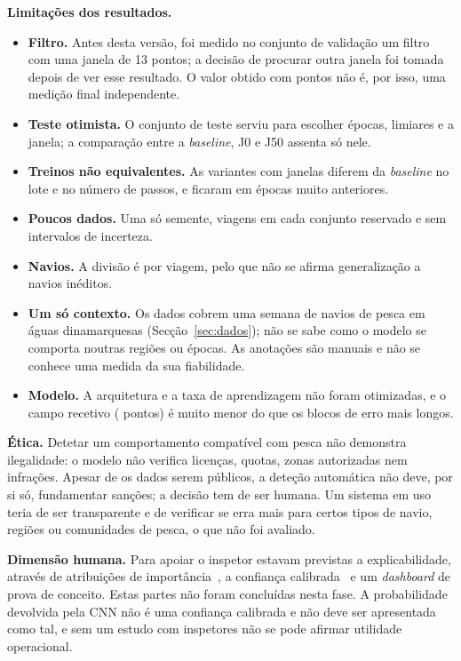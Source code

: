 \documentclass{article}
\begin{document}
\textbf{Limitações dos resultados.}
\begin{itemize}
\item \textbf{Filtro.} Antes desta versão, foi medido no conjunto de validação um filtro com uma janela de 13 pontos; a decisão de procurar outra janela foi tomada depois de ver esse resultado. O valor obtido com \resPpJanela{} pontos não é, por isso, uma medição final independente.
\item \textbf{Teste otimista.} O conjunto de teste serviu para escolher épocas, limiares e a janela; a comparação entre a \emph{baseline}, J0 e J50 assenta só nele.
\item \textbf{Treinos não equivalentes.} As variantes com janelas diferem da \emph{baseline} no lote e no número de passos, e ficaram em épocas muito anteriores.
\item \textbf{Poucos dados.} Uma só semente, \resVaViagens{} viagens em cada conjunto reservado e sem intervalos de incerteza.
\item \textbf{Navios.} A divisão é por viagem, pelo que não se afirma generalização a navios inéditos.
\item \textbf{Um só contexto.} Os dados cobrem uma semana de navios de pesca em águas dinamarquesas (Secção~\ref{sec:dados}); não se sabe como o modelo se comporta noutras regiões ou épocas. As anotações são manuais e não se conhece uma medida da sua fiabilidade.
\item \textbf{Modelo.} A arquitetura e a taxa de aprendizagem não foram otimizadas, e o campo recetivo (\resModCampo{} pontos) é muito menor do que os blocos de erro mais longos.
\end{itemize}

\textbf{Ética.} Detetar um comportamento compatível com pesca não demonstra ilegalidade: o modelo não verifica licenças, quotas, zonas autorizadas nem infrações. Apesar de os dados serem públicos, a deteção automática não deve, por si só, fundamentar sanções; a decisão tem de ser humana. Um sistema em uso teria de ser transparente e de verificar se erra mais para certos tipos de navio, regiões ou comunidades de pesca, o que não foi avaliado.

\textbf{Dimensão humana.} Para apoiar o inspetor estavam previstas a explicabilidade, através de atribuições de importância~\cite{lundberg2017}, a confiança calibrada~\cite{guo2017} e um \emph{dashboard} de prova de conceito. Estas partes não foram concluídas nesta fase. A probabilidade devolvida pela CNN não é uma confiança calibrada e não deve ser apresentada como tal, e sem um estudo com inspetores não se pode afirmar utilidade operacional.
\end{document}
